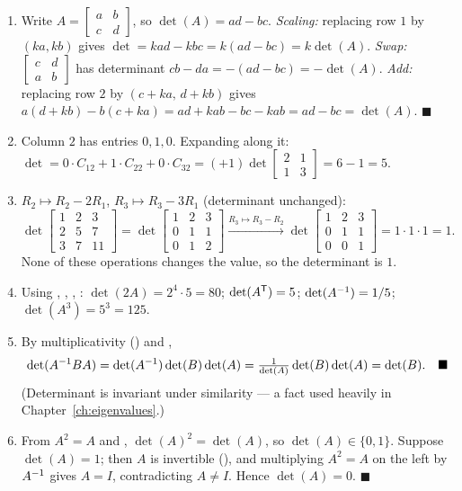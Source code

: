 \begin{enumerate}[label=\textbf{2.\arabic*},leftmargin=2.6em,itemsep=8pt]

\item Write $A=\left[\begin{smallmatrix}a&b\\c&d\end{smallmatrix}\right]$, so $\det(A)=ad-bc$.
\emph{Scaling:} replacing row $1$ by $(ka,kb)$ gives $\det=kad-kbc=k(ad-bc)=k\det(A)$. \emph{Swap:} $\left[\begin{smallmatrix}c&d\\a&b\end{smallmatrix}\right]$ has determinant $cb-da=-(ad-bc)=-\det(A)$. \emph{Add:} replacing row $2$ by $(c+ka,\,d+kb)$ gives $a(d+kb)-b(c+ka)=ad+kab-bc-kab=ad-bc=\det(A)$. \;$\blacksquare$

\item Column $2$ has entries $0,1,0$. Expanding along it: $\det=0\cdot C_{12}+1\cdot C_{22}+0\cdot C_{32}=(+1)\det\!\left[\begin{smallmatrix}2&1\\1&3\end{smallmatrix}\right]=6-1=5$.

\item $R_2\mapsto R_2-2R_1$, $R_3\mapsto R_3-3R_1$ (determinant unchanged):
\[
\det\!\begin{bmatrix}1&2&3\\2&5&7\\3&7&11\end{bmatrix}=\det\!\begin{bmatrix}1&2&3\\0&1&1\\0&1&2\end{bmatrix}\xrightarrow{R_3\mapsto R_3-R_2}\det\!\begin{bmatrix}1&2&3\\0&1&1\\0&0&1\end{bmatrix}=1\cdot1\cdot1=1.
\]
None of these operations changes the value, so the determinant is $1$.

\item Using , , , : $\det(2A)=2^4\cdot5=80$; $\det(A^{\mathsf{T}})=5$; $\det(A^{-1})=1/5$; $\det(A^3)=5^3=125$.

\item By multiplicativity () and ,
\[
\det(A^{-1} BA)=\det(A^{-1})\det(B)\det(A)=\tfrac{1}{\det(A)}\det(B)\det(A)=\det(B).\quad\blacksquare
\]
(Determinant is invariant under similarity --- a fact used heavily in Chapter~\ref{ch:eigenvalues}.)

\item From $A^2=A$ and , $\det(A)^2=\det(A)$, so $\det(A)\in\{0,1\}$. Suppose $\det(A)=1$; then $A$ is invertible (), and multiplying $A^2=A$ on the left by $A^{-1}$ gives $A=I$, contradicting $A\neq I$. Hence $\det(A)=0$. \;$\blacksquare$

\end{enumerate}
